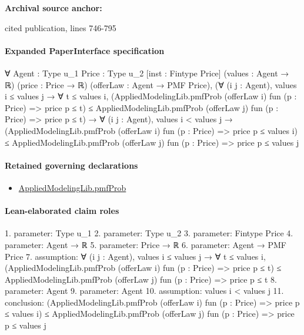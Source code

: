 \documentclass[10pt]{article}
\begin{document}
\textbf{Archival source anchor:} {\footnotesize\raggedright cited publication, lines 746-\allowbreak{}795\par}
\paragraph{Expanded PaperInterface specification}
\begin{ReviewVerbatim}
∀ {Agent : Type u_1} {Price : Type u_2} [inst : Fintype Price] (values : Agent → ℝ) (price : Price → ℝ)
  (offerLaw : Agent → PMF Price),
  (∀ (i j : Agent),
      values i ≤ values j →
        ∀ t ≤ values i,
          (AppliedModelingLib.pmfProb (offerLaw i) fun (p : Price) => price p ≤ t) ≤
            AppliedModelingLib.pmfProb (offerLaw j) fun (p : Price) => price p ≤ t) →
    ∀ (i j : Agent),
      values i < values j →
        (AppliedModelingLib.pmfProb (offerLaw i) fun (p : Price) => price p ≤ values i) ≤
          AppliedModelingLib.pmfProb (offerLaw j) fun (p : Price) => price p ≤ values j
\end{ReviewVerbatim}

\paragraph{Retained governing declarations}
\begin{itemize}\raggedright
\item \hyperlink{governing-declaration-9c38d53b9d664221}{Applied\allowbreak{}Modeling\allowbreak{}Lib.\allowbreak{}pmf\allowbreak{}Prob}
\end{itemize}
\paragraph{Lean-elaborated claim roles}\begin{ReviewVerbatim}
1. parameter: Type u_1
2. parameter: Type u_2
3. parameter: Fintype Price
4. parameter: Agent → ℝ
5. parameter: Price → ℝ
6. parameter: Agent → PMF Price
7. assumption: ∀ (i j : Agent),
  values i ≤ values j →
    ∀ t ≤ values i,
      (AppliedModelingLib.pmfProb (offerLaw i) fun (p : Price) => price p ≤ t) ≤
        AppliedModelingLib.pmfProb (offerLaw j) fun (p : Price) => price p ≤ t
8. parameter: Agent
9. parameter: Agent
10. assumption: values i < values j
11. conclusion: (AppliedModelingLib.pmfProb (offerLaw i) fun (p : Price) => price p ≤ values i) ≤
  AppliedModelingLib.pmfProb (offerLaw j) fun (p : Price) => price p ≤ values j
\end{ReviewVerbatim}
\end{document}
